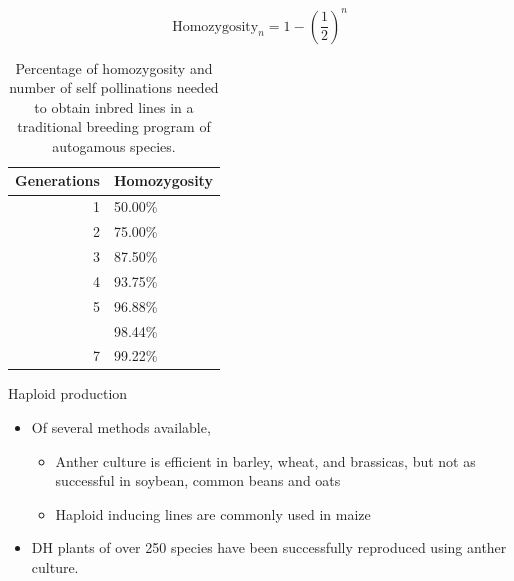 \documentclass[
  ignorenonframetext,
  aspectratio=169]{beamer}
\providecommand{\tightlist}{%
  \setlength{\itemsep}{0pt}\setlength{\parskip}{0pt}}
\begin{document}
\begin{frame}{}
\protect\hypertarget{section-2}{}
\[
\text{Homozygosity}_n = 1 - \left(\frac{1}{2}\right)^n
\]

\begin{table}

\caption{\label{tab:homozygosity-accumulation}Percentage of homozygosity and number of self pollinations needed to obtain inbred lines in a traditional breeding program of autogamous species.}
\centering
\begin{tabular}[t]{rl}
\toprule
Generations & Homozygosity\\
\midrule
1 & 50.00\%\\
2 & 75.00\%\\
3 & 87.50\%\\
4 & 93.75\%\\
5 & 96.88\%\\
\addlinespace
6 & 98.44\%\\
7 & 99.22\%\\
\bottomrule
\end{tabular}
\end{table}
\end{frame}

\begin{frame}{Haploid production}
\protect\hypertarget{haploid-production}{}

\begin{itemize}
\tightlist
\item
  Of several methods available,

  \begin{itemize}
  \tightlist
  \item
    Anther culture is efficient in barley, wheat, and brassicas, but not
    as successful in soybean, common beans and oats
  \item
    Haploid inducing lines are commonly used in maize
  \end{itemize}
\item
  DH plants of over 250 species have been successfully reproduced using
  anther culture.
\end{itemize}
\end{frame}
\end{document}
